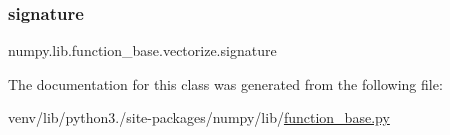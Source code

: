\subsubsection{\texorpdfstring{signature}{signature}}
{\footnotesize\ttfamily numpy.\+lib.\+function\+\_\+base.\+vectorize.\+signature}



The documentation for this class was generated from the following file\+:\begin{DoxyCompactItemize}
\item 
venv/lib/python3./site-\/packages/numpy/lib/\hyperlink{lib_2function__base_8py}{function\+\_\+base.\+py}\end{DoxyCompactItemize}
